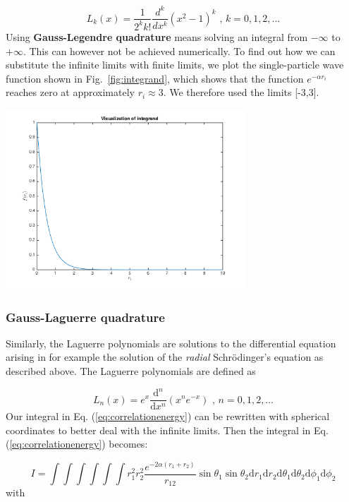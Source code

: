 \documentclass{article}
\begin{document}
\begin{equation}
	L_k(x) = \frac{1}{2^k k!} \frac{d^k}{dx^k} (x^2 - 1)^k \textrm{ , } k = 0,1,2, \dots
\end{equation}
Using \textbf{Gauss-Legendre quadrature} means solving an integral from $- \infty$ to $+ \infty$. This can however not be achieved numerically. To find out how we can substitute the infinite limits with finite limits, we plot the single-particle wave function shown in Fig.~\ref{fig:integrand}, which shows that the function $e^{-\alpha r_i}$ reaches zero at approximately $r_i \approx 3$. We therefore used the limits [-3,3].

\begin{center}
	\includegraphics[width=90mm]{integrand.png} 	
	\label{fig:integrand}
\end{center}



\subsubsection{Gauss-Laguerre quadrature}
Similarly, the Laguerre polynomials are solutions to the differential equation arising in for example the solution of the \textit{radial} Schr\"{o}dinger's equation as described above. The Laguerre polynomials are defined as

\begin{equation}
	L_n(x) = e^x \frac{\mathrm{d}^n}{\mathrm{d}x^n} (x^n e^{-x}) \textrm{ , } n = 0,1,2, \dots
\end{equation}
Our integral in Eq. (\ref{eq:correlationenergy}) can be rewritten with spherical coordinates to better deal with the infinite limits. Then the integral in Eq. (\ref{eq:correlationenergy}) becomes:

\begin{equation}
	I = \int \int \int \int  \int \int    r_1^2 r_2^2 \frac{e^{- 2 \alpha (r_1 + r_2)}}{r_{12}} \sin \theta_1 \sin \theta_2 \mathrm{d}r_1  \mathrm{d}r_2 \mathrm{d}\theta_1 \mathrm{d}\theta_2 \mathrm{d}\phi_1\mathrm{d}\phi_2
\end{equation}
with
\end{document}
